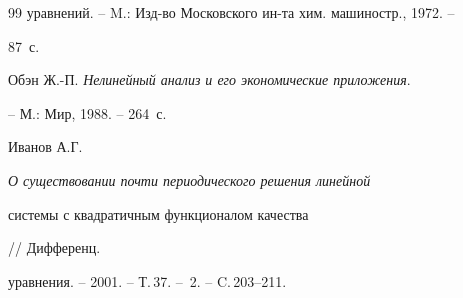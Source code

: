 \begin{thebibliography}{99}
{уравнений}. -- M.: Изд-во Московского ин-та хим. машиностр., 1972. --


87~с.




Обэн Ж.-П. {\em Нелинейный анализ и его экономические приложения}.


-- М.: Мир, 1988. -- 264~с.




Иванов А.Г. {\em О существовании почти периодического решения линейной


системы с квадратичным функционалом качества} // Дифференц.


уравнения. -- 2001. -- Т.\,37. -- \No\,2. -- C.\,203--211.





\end{thebibliography}





\vskip 2cm












\label{end}





